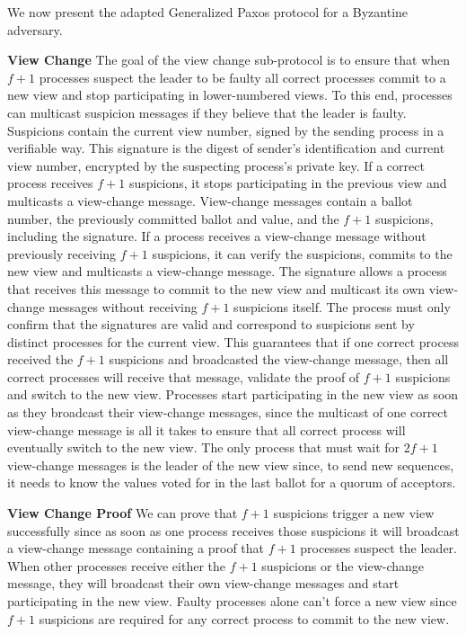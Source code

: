 
We now present the adapted Generalized Paxos protocol for a Byzantine adversary.\par
\textbf{View Change} The goal of the view change sub-protocol is to ensure that when $f+1$ processes suspect the leader to be faulty all correct processes commit to a new view and stop participating in lower-numbered views. To this end, processes can multicast suspicion messages if they believe that the leader is faulty. Suspicions contain the current view number, signed by the sending process in a verifiable way. This signature is the digest of sender's identification and current view number, encrypted by the suspecting process's private key. If a correct process receives $f+1$ suspicions, it stops participating in the previous view and multicasts a view-change message. View-change messages contain a ballot number, the previously committed ballot and value, and the $f+1$ suspicions, including the signature. If a process receives a view-change message without previously receiving $f+1$ suspicions, it can verify the suspicions, commits to the new view and multicasts a view-change message. The signature allows a process that receives this message to commit to the new view and multicast its own view-change messages without receiving $f+1$ suspicions itself. The process must only confirm that the signatures are valid and correspond to suspicions sent by distinct processes for the current view. This guarantees that if one correct process received the $f+1$ suspicions and broadcasted the view-change message, then all correct processes will receive that message, validate the proof of $f+1$ suspicions and switch to the new view. Processes start participating in the new view as soon as they broadcast their view-change messages, since the multicast of one correct view-change message is all it takes to ensure that all correct process will eventually switch to the new view. The only process that must wait for $2f+1$ view-change messages is the leader of the new view since, to send new sequences, it needs to know the values voted for in the last ballot for a quorum of acceptors. \par
\textbf{View Change Proof} We can prove that $f+1$ suspicions trigger a new view successfully since as soon as one process receives those suspicions it will broadcast a view-change message containing a proof that $f+1$ processes suspect the leader. When other processes receive either the $f+1$ suspicions or the view-change message, they will broadcast their own view-change messages and start participating in the new view. Faulty processes alone can't force a new view since $f+1$ suspicions are required for any correct process to commit to the new view.\par

